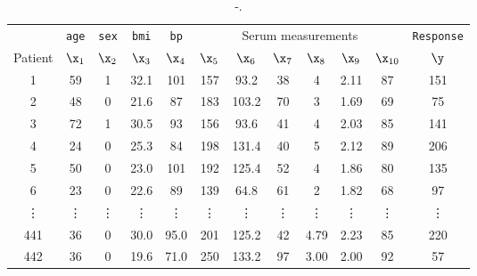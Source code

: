 \begin{table}[H] 
\centering 
\begin{tabular}{cccccccccccc} 
& \texttt{age} & \texttt{sex} & \texttt{bmi} & \texttt{bp} & \multicolumn{6}{c}{Serum measurements} & \texttt{Response} \\
\cline{6-11}
Patient & \(\x_1\) & \(\x_2\) & \(\x_3\) & \(\x_4\) & \(\x_5\) & \(\x_6\) & \(\x_7\) & \(\x_8\) & \(\x_9\) & \(\x_{10}\) & \(\y\) \\
\midrule
1 & 59 &  1 & 32.1 & 101 & 157 & 93.2 & 38 &  4 & 2.11 & 87 & 151 \\
2 & 48 &  0 & 21.6 & 87 & 183 & 103.2 & 70  & 3 & 1.69 & 69  & 75 \\
3 & 72 &  1 & 30.5 & 93 & 156 & 93.6 & 41  & 4 & 2.03 & 85 & 141 \\
4 & 24  & 0 & 25.3 & 84 & 198 & 131.4 & 40 &  5 & 2.12 & 89 & 206 \\
5 & 50  & 0 & 23.0 & 101 & 192 & 125.4 & 52 &  4 & 1.86 & 80 & 135 \\
6 & 23 &  0 & 22.6 & 89 & 139 & 64.8 & 61 &  2 & 1.82 & 68 &  97 \\
\vdots & \vdots & \vdots & \vdots & \vdots & \vdots & \vdots & \vdots & \vdots & \vdots & \vdots & \vdots \\
441 & 36  & 0 & 30.0 & 95.0 & 201 & 125.2 & 42 & 4.79 & 2.23 & 85 & 220 \\
442 & 36 & 0 & 19.6 & 71.0 & 250 & 133.2 & 97 & 3.00 & 2.00 & 92 &  57 \\ \bottomrule
\end{tabular}  
\caption{-.} \label{tab:diabetes} 
\end{table} 